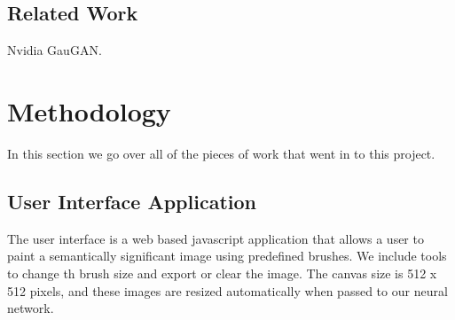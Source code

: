 \documentclass[twocolumn]{article}
\begin{document}
	\subsection{Related Work}

	Nvidia GauGAN.
	
	\section{Methodology}
	
	In this section we go over all of the pieces of work that went in to this project.
	
	\subsection{User Interface Application}
	
	The user interface is a web based javascript application that allows a user to paint a semantically significant image using predefined brushes. We include tools to change th brush size and export or clear the image. The canvas size is 512 x 512 pixels, and these images are resized automatically when passed to our neural network.
\end{document}
